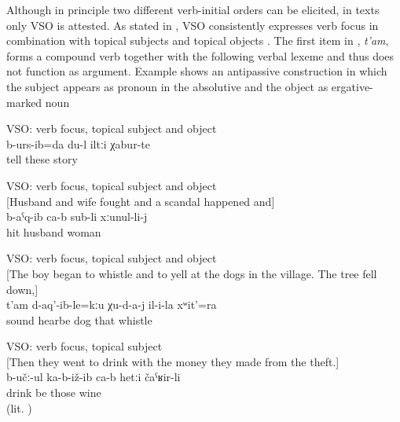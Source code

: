 Although in principle two different verb-initial orders can be elicited, in texts only VSO is attested. As stated in \citet{Forker.Belyaev2016}, VSO consistently expresses verb focus in combination with topical subjects and topical objects . The first item in , \textit{t'am}, forms a compound verb together with the following verbal lexeme and thus does not function as argument. Example  shows an antipassive construction in which the subject appears as pronoun in the absolutive and the object as ergative-marked noun 
%
\begin{exe}
	\ex	VSO: verb focus, topical subject and object\\	\label{ex:‎I already told these stories VSO}
	\gll	b-urs-ib=da	du-l	iltːi	χabur-te\\
		tell		these	story\\
	\glt	{}

	\ex	VSO: verb focus, topical subject and object\\\label{ex:‎‎The husband hit the wife VSO}%
		[Husband and wife fought and a scandal happened and]\\
	\gll	b-aˁq-ib	ca-b	sub-li	xːunul-li-j\\
		hit		husband	woman\\
	\glt	{}

	\ex	VSO: verb focus, topical subject and object\\\label{ex:and the dogs didn't hear his sound or whistling VSO}%
		[The boy began to whistle and to yell at the dogs in the village. The tree fell down,]\\
	\gll	t'am	d-aq'-ib-le=kːu	χu-d-a-j	il-i-la	xʷit'=ra\\
		sound	hearbe	dog	that	whistle\\
	\glt	{}

	\ex	VSO: verb focus, topical subject\\\label{ex:They sit and drink wine.IS}%
		[Then they went to drink with the money they made from the theft.]\\
	\gll	b-učː-ul	ka-b-iž-ib	ca-b	hetːi	čaˁʁir-li\\
		drink	be		those	wine\\
	\glt	{} (lit. )
\end{exe}

